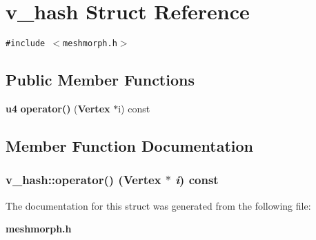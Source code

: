 \section{v\_\-hash Struct Reference}
\label{structv__hash}
{\tt \#include $<$meshmorph.h$>$}

\subsection*{Public Member Functions}
\begin{CompactItemize}
\item 
{\bf u4} {\bf operator()} ({\bf Vertex} $\ast$i) const
\end{CompactItemize}


\subsection{Member Function Documentation}
\subsubsection{ v\_\-hash::operator() ({\bf Vertex} $\ast$ {\em i}) const\hspace{0.3cm}{\tt  [inline]}}\label{structv__hash_70a95c1d9155c62221449480fd43bef8}




The documentation for this struct was generated from the following file:\begin{CompactItemize}
\item 
{\bf meshmorph.h}\end{CompactItemize}
